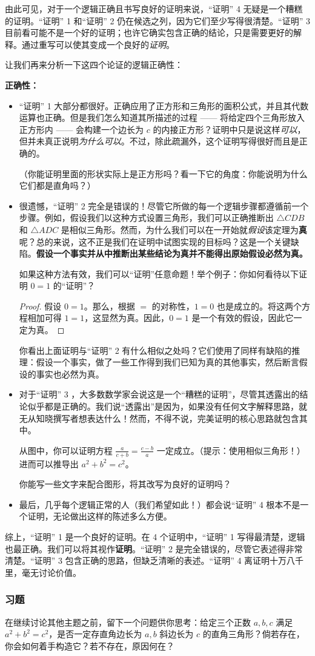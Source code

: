 由此可见，对于一个逻辑正确且书写良好的证明来说，``证明'' 4 无疑是一个糟糕的证明。``证明'' 1 和``证明'' 2 仍在候选之列，因为它们至少写得很清楚。``证明'' 3 目前看可能不是一个好的证明；也许它确实包含正确的结论，只是需要更好的解释。通过重写可以使其变成一个良好的\emph{证明}。

让我们再来分析一下这四个论证的逻辑正确性：

\textbf{正确性：}

\begin{itemize}
    \item ``证明'' 1 大部分都很好。正确应用了正方形和三角形的面积公式，并且其代数运算也正确。但是我们怎么知道其所描述的过程 —— 将给定四个三角形放入正方形内 —— 会构建一个边长为 $c$ 的内接正方形？证明中只是说这样\emph{可以}，但并未真正说明\emph{为什么可以}。不过，除此疏漏外，这个证明写得很好而且是正确的。
    
    （你能证明里面的形状实际上是正方形吗？看一下它的角度：你能说明为什么它们都是直角吗？）
    \item 很遗憾，``证明'' 2 完全是错误的！尽管它所做的每一个逻辑步骤都遵循前一个步骤。例如，假设我们以这种方式设置三角形，我们可以正确推断出 $\triangle CDB$ 和 $\triangle ADC$ 是相似三角形。然而，为什么我们可以在一开始就\emph{假设}该定理为\textbf{真}呢？总的来说，这不正是我们在证明中试图实现的目标吗？这是一个关键缺陷。\textbf{假设一个事实并从中推断出某些结论为真并不能得出原始假设必然为真。}
    
    如果这种方法有效，我们可以``证明''任意命题！举个例子：你如何看待以下证明 $0 = 1$ 的``证明''？
    \begin{proof}
        假设 $0 = 1$。那么，根据 $=$ 的对称性，$1 = 0$ 也是成立的。将这两个方程相加可得 $1 = 1$，这显然为真。因此，$0 = 1$ 是一个有效的假设，因此它一定为真。
    \end{proof}
    你看出上面证明与``证明'' 2 有什么相似之处吗？它们使用了同样有缺陷的推理：假设一个事实，做了一些工作得到我们已知为真的其他事实，然后断言假设的事实也必然为真。
    \item 对于``证明'' 3 ，大多数数学家会说这是一个``糟糕的证明''，尽管其透露出的结论似乎都是正确的。我们说``透露出''是因为，如果没有任何文字解释思路，就无从知晓撰写者想表达什么！然而，不得不说，完美证明的核心思路就包含其中。
    
    从图中，你可以证明方程 $\frac{a}{c+b} = \frac{c-b}{a}$ 一定成立。（提示：使用相似三角形！）进而可以推导出 $a^2 + b^2 = c^2$。

    你能写一些文字来配合图形，将其改写为良好的证明吗？
    \item 最后，几乎每个逻辑正常的人（我们希望如此！）都会说``证明'' 4 根本不是一个证明，无论做出这样的陈述多么方便。
\end{itemize}

综上，``证明'' 1 是一个良好的证明。在 4 个证明中，``证明'' 1 写得最清楚，逻辑也最正确。我们可以将其视作\textbf{证明}。``证明'' 2 是完全错误的，尽管它表述得非常清楚。``证明'' 3 包含正确的思路，但缺乏清晰的表述。``证明'' 4 离证明十万八千里，毫无讨论价值。

\subsubsection*{习题}

在继续讨论其他主题之前，留下一个问题供你思考：给定三个正数 $a,b,c$ 满足 $a^2+b^2=c^2$，是否一定存直角边长为 $a,b$ 斜边长为 $c$ 的直角三角形？倘若存在，你会如何着手构造它？若不存在，原因何在？

